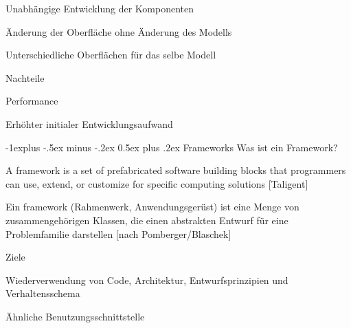 \documentclass[a4paper]{article}
\makeatletter
\renewcommand{\subsection}{\@startsection{subsection}{2}{0mm}%
                                {-1explus -.5ex minus -.2ex}%
                                {0.5ex plus .2ex}%
                                {\normalfont\normalsize\bfseries}}
\makeatother
\begin{document}
\begin{multicols}{3}
\begin{itemize*}
          \begin{itemize*}
            \item Unabhängige Entwicklung der Komponenten
            \item Änderung der Oberfläche ohne Änderung des Modells
            \item Unterschiedliche Oberflächen für das selbe Modell
          \end{itemize*}
    \item Nachteile
          \begin{itemize*}
            \item Performance
            \item Erhöhter initialer Entwicklungsaufwand
          \end{itemize*}
  \end{itemize*}


  \subsection{Frameworks}
  Was ist ein Framework?
  \begin{itemize*}
    \item A framework is a set of prefabricated software building blocks that programmers can use, extend, or customize for specific computing solutions [Taligent]
    \item Ein framework (Rahmenwerk, Anwendungsgerüst) ist eine Menge von zusammengehörigen Klassen, die einen abstrakten Entwurf für eine Problemfamilie darstellen [nach Pomberger/Blaschek]
  \end{itemize*}

  Ziele
  \begin{itemize*}
    \item Wiederverwendung von Code, Architektur, Entwurfsprinzipien und Verhaltensschema
    \item Ähnliche Benutzungsschnittstelle
  \end{itemize*}


\end{multicols}
\end{document}
